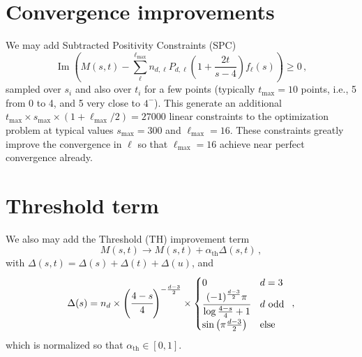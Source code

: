 \section*{Convergence improvements}
We may add Subtracted Positivity Constraints (SPC) 
\begin{equation}
\operatorname{Im}\left(M(s,t)-
\sum_\ell^{\ell_\mathrm{max}} n_{d,\ell}
P_{d,\ell}\left(1+\frac{2t}{s-4}\right)
f_\ell(s)
\right)\geq0\,,
\end{equation}
sampled over $s_i$ and also over $t_i$ for a few points (typically $t_{\mathrm{max}}=10$ points, i.e., 5 from 0 to 4, and 5 very close to $4^-$). This generate an additional $t_{\mathrm{max}}\times s_{\mathrm{max}}\times (1+\ell_{\mathrm{max}}/2) =27000$ linear constraints to the optimization problem at typical values $s_{\mathrm{max}}=300$ and $\ell_{\mathrm{max}}=16$. These constraints greatly improve the convergence in $\ell$ so that $\ell_{\mathrm{max}}=16$ achieve near perfect convergence already. 




\section*{Threshold term}
We also may add the Threshold (TH) improvement term
\begin{equation}
M(s,t)\rightarrow M(s,t)+\alpha_{\mathrm{th}}\Delta(s,t)\,,
\end{equation}
with
$\Delta(s,t)=\Delta(s)+\Delta(t)+\Delta(u)$, and 
\begin{equation}
\Delta(s)=
n_d\times
\left(\cfrac{4-s}{4}\right)^{-\frac{d-3}{2}}\times
\begin{cases}
0 & d=3 \\
\cfrac{(-1)^{\frac{d-3}{2}}\pi}{\log{\frac{4-s}{4}}+1} & d \text{ odd} \\
\sin\left(\pi\frac{d-3}{2}\right) & \text{else}
\end{cases}\,\,\,,
\end{equation}
which is normalized so that $\alpha_{\mathrm{th}}\in[0,1]$.



